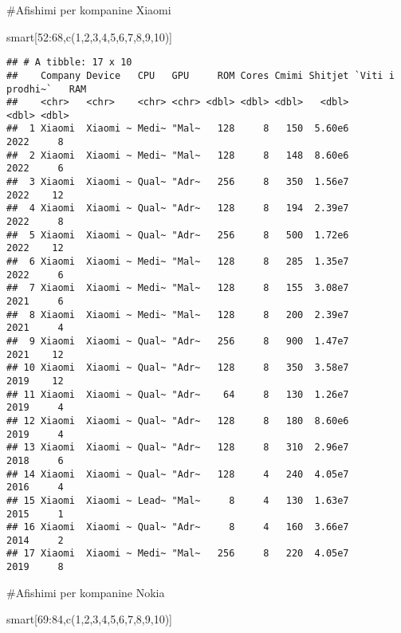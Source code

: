 \documentclass[
]{article}
\newenvironment{Shaded}{\begin{snugshade}}{\end{snugshade}}
\newcommand{\DecValTok}[1]{\textcolor[rgb]{0.00,0.00,0.81}{#1}}
\newcommand{\FunctionTok}[1]{\textcolor[rgb]{0.00,0.00,0.00}{#1}}
\newcommand{\NormalTok}[1]{#1}
\newcommand{\SpecialCharTok}[1]{\textcolor[rgb]{0.00,0.00,0.00}{#1}}
\begin{document}
\#Afishimi per kompanine Xiaomi

\begin{Shaded}
\begin{Highlighting}[]
\NormalTok{smart[}\DecValTok{52}\SpecialCharTok{:}\DecValTok{68}\NormalTok{,}\FunctionTok{c}\NormalTok{(}\DecValTok{1}\NormalTok{,}\DecValTok{2}\NormalTok{,}\DecValTok{3}\NormalTok{,}\DecValTok{4}\NormalTok{,}\DecValTok{5}\NormalTok{,}\DecValTok{6}\NormalTok{,}\DecValTok{7}\NormalTok{,}\DecValTok{8}\NormalTok{,}\DecValTok{9}\NormalTok{,}\DecValTok{10}\NormalTok{)]}
\end{Highlighting}
\end{Shaded}

\begin{verbatim}
## # A tibble: 17 x 10
##    Company Device   CPU   GPU     ROM Cores Cmimi Shitjet `Viti i prodhi~`   RAM
##    <chr>   <chr>    <chr> <chr> <dbl> <dbl> <dbl>   <dbl>            <dbl> <dbl>
##  1 Xiaomi  Xiaomi ~ Medi~ "Mal~   128     8   150  5.60e6             2022     8
##  2 Xiaomi  Xiaomi ~ Medi~ "Mal~   128     8   148  8.60e6             2022     6
##  3 Xiaomi  Xiaomi ~ Qual~ "Adr~   256     8   350  1.56e7             2022    12
##  4 Xiaomi  Xiaomi ~ Qual~ "Adr~   128     8   194  2.39e7             2022     8
##  5 Xiaomi  Xiaomi ~ Qual~ "Adr~   256     8   500  1.72e6             2022    12
##  6 Xiaomi  Xiaomi ~ Medi~ "Mal~   128     8   285  1.35e7             2022     6
##  7 Xiaomi  Xiaomi ~ Medi~ "Mal~   128     8   155  3.08e7             2021     6
##  8 Xiaomi  Xiaomi ~ Medi~ "Mal~   128     8   200  2.39e7             2021     4
##  9 Xiaomi  Xiaomi ~ Qual~ "Adr~   256     8   900  1.47e7             2021    12
## 10 Xiaomi  Xiaomi ~ Qual~ "Adr~   128     8   350  3.58e7             2019    12
## 11 Xiaomi  Xiaomi ~ Qual~ "Adr~    64     8   130  1.26e7             2019     4
## 12 Xiaomi  Xiaomi ~ Qual~ "Adr~   128     8   180  8.60e6             2019     4
## 13 Xiaomi  Xiaomi ~ Qual~ "Adr~   128     8   310  2.96e7             2018     6
## 14 Xiaomi  Xiaomi ~ Qual~ "Adr~   128     4   240  4.05e7             2016     4
## 15 Xiaomi  Xiaomi ~ Lead~ "Mal~     8     4   130  1.63e7             2015     1
## 16 Xiaomi  Xiaomi ~ Qual~ "Adr~     8     4   160  3.66e7             2014     2
## 17 Xiaomi  Xiaomi ~ Medi~ "Mal~   256     8   220  4.05e7             2019     8
\end{verbatim}

\#Afishimi per kompanine Nokia

\begin{Shaded}
\begin{Highlighting}[]
\NormalTok{smart[}\DecValTok{69}\SpecialCharTok{:}\DecValTok{84}\NormalTok{,}\FunctionTok{c}\NormalTok{(}\DecValTok{1}\NormalTok{,}\DecValTok{2}\NormalTok{,}\DecValTok{3}\NormalTok{,}\DecValTok{4}\NormalTok{,}\DecValTok{5}\NormalTok{,}\DecValTok{6}\NormalTok{,}\DecValTok{7}\NormalTok{,}\DecValTok{8}\NormalTok{,}\DecValTok{9}\NormalTok{,}\DecValTok{10}\NormalTok{)]}
\end{Highlighting}
\end{Shaded}
\end{document}
